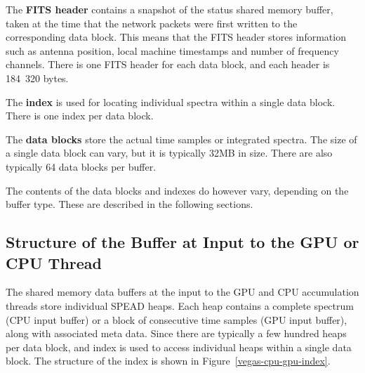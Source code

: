 \documentclass[11pt]{article} %
\begin{document}
The {\bf FITS header} contains a snapshot of the status shared memory buffer, taken at the time that the network packets were first written to the corresponding data block. This means that the FITS header stores information such as antenna position, local machine timestamps and number of frequency channels. There is one FITS header for each data block, and each header is 184~320 bytes.

The {\bf index} is used for locating individual spectra within a single data block. There is one index per data block.

The {\bf data blocks} store the actual time samples or integrated spectra. The size of a single data block can vary, but it is typically 32MB in size. There are also typically 64 data blocks per buffer.

The contents of the data blocks and indexes do however vary, depending on the buffer type. These are described in the following sections.

\subsection{Structure of the Buffer at Input to the GPU or CPU Thread}

The shared memory data buffers at the input to the GPU and CPU accumulation threads store individual SPEAD heaps. Each heap contains a complete spectrum (CPU input buffer) or a block of consecutive time samples (GPU input buffer), along with associated meta data. Since there are typically a few hundred heaps per data block, and index is used to access individual heaps within a single data block. The structure of the index is shown in Figure~\ref{vegas-cpu-gpu-index}.
\end{document}
